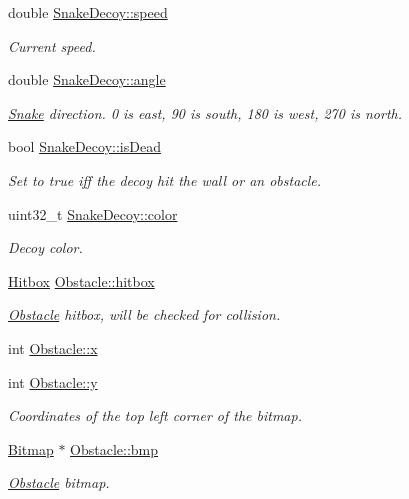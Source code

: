 \begin{DoxyCompactItemize}
double \mbox{\hyperlink{group__snake_gac676e96d99b1a684120e6cf048e2e6c0}{Snake\+Decoy\+::speed}}
\begin{DoxyCompactList}\small\item\em Current speed. \end{DoxyCompactList}\item 
double \mbox{\hyperlink{group__snake_ga24389f11de2d62dfff3e4357053e0083}{Snake\+Decoy\+::angle}}
\begin{DoxyCompactList}\small\item\em \mbox{\hyperlink{struct_snake}{Snake}} direction. 0 is east, 90 is south, 180 is west, 270 is north. \end{DoxyCompactList}\item 
bool \mbox{\hyperlink{group__snake_ga825c2d7442b47b340bbf95bd42bc5435}{Snake\+Decoy\+::is\+Dead}}
\begin{DoxyCompactList}\small\item\em Set to true iff the decoy hit the wall or an obstacle. \end{DoxyCompactList}\item 
uint32\+\_\+t \mbox{\hyperlink{group__snake_ga5234b4454a0f59fc2aac841aeb03fbe9}{Snake\+Decoy\+::color}}
\begin{DoxyCompactList}\small\item\em Decoy color. \end{DoxyCompactList}\item 
\mbox{\hyperlink{struct_hitbox}{Hitbox}} \mbox{\hyperlink{group__snake_ga7db468fea7e79f8f801944afbea0501e}{Obstacle\+::hitbox}}
\begin{DoxyCompactList}\small\item\em \mbox{\hyperlink{struct_obstacle}{Obstacle}} hitbox, will be checked for collision. \end{DoxyCompactList}\item 
int \mbox{\hyperlink{group__snake_gaf70994e9c31a4b2fbd941479e13684af}{Obstacle\+::x}}
\item 
int \mbox{\hyperlink{group__snake_ga30b2c3c1f048ca6013dcd237e6948f5c}{Obstacle\+::y}}
\begin{DoxyCompactList}\small\item\em Coordinates of the top left corner of the bitmap. \end{DoxyCompactList}\item 
\mbox{\hyperlink{struct_bitmap}{Bitmap}} $\ast$ \mbox{\hyperlink{group__snake_ga97d18d6a1e7337ec4126c187a74074b7}{Obstacle\+::bmp}}
\begin{DoxyCompactList}\small\item\em \mbox{\hyperlink{struct_obstacle}{Obstacle}} bitmap. \end{DoxyCompactList}\item 

\end{DoxyCompactItemize}
